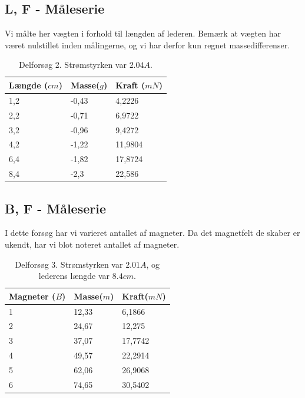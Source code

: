 \documentclass[10pt,a4paper]{article}
\theoremstyle{break}
\theoremstyle{nonumberplain}
\begin{document}
\pagebreak
\subsection{L, F - Måleserie}
Vi målte her vægten i forhold til længden af lederen. 
Bemærk at vægten har været nulstillet inden målingerne, og vi har derfor kun regnet massedifferenser. 

\begin{table}[h]
\centering

\begin{tabular}{|l|ll|}
\hline
\textbf{Længde ($cm$)} & \textbf{Masse($g$)} & \textbf{Kraft ($mN$)} \\ \hline
1,2                    & -0,43               & 4,2226                \\
2,2                    & -0,71               & 6,9722                \\
3,2                    & -0,96               & 9,4272                \\
4,2                    & -1,22               & 11,9804               \\
6,4                    & -1,82               & 17,8724               \\
8,4                    & -2,3                & 22,586               \\
\hline
\end{tabular}
\caption{Delforsøg 2. Strømstyrken var $2.04A$.}
\end{table}

\subsection{B, F - Måleserie}
I dette forsøg har vi varieret antallet af magneter. 
Da det magnetfelt de skaber er ukendt, har vi blot noteret antallet af magneter.

\begin{table}[h]
\centering

\begin{tabular}{|l|ll|}
\hline
\textbf{Magneter ($B$)} & \textbf{Masse($m$)} & \textbf{Kraft($mN$)} \\ \hline
1                       & 12,33               & 6,1866               \\
2                       & 24,67               & 12,275               \\
3                       & 37,07               & 17,7742              \\
4                       & 49,57               & 22,2914              \\
5                       & 62,06               & 26,9068              \\
6                       & 74,65               & 30,5402   			\\
\hline          
\end{tabular}

\caption{Delforsøg 3. Strømstyrken var $2.01 A$, og lederens længde var $8.4cm$.}
\end{table}
\end{document}
